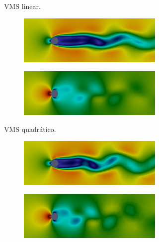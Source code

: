 \begin{figure}[h!]
\begin{subfigure}{\textwidth}
\begin{subfigure}{.42\textwidth}
        \end{subfigure}
        \caption{VMS linear.}
    \end{subfigure}
    \begin{subfigure}{\textwidth}\centering
        \begin{subfigure}{.42\textwidth}
            \includegraphics[width=\linewidth]{Figuras/cylinder/VMS-Qua-vel.png}
        \end{subfigure}
        \begin{subfigure}{.42\textwidth}
            \includegraphics[width=\linewidth]{Figuras/cylinder/VMS-Qua-pre.png}
        \end{subfigure}
        \caption{VMS quadrático.}
    \end{subfigure}
    \begin{subfigure}{\textwidth}\centering
        \begin{subfigure}{.42\textwidth}
            \includegraphics[width=\linewidth]{Figuras/cylinder/LES-vel.png}
        \end{subfigure}
        \begin{subfigure}{.42\textwidth}
            \includegraphics[width=\linewidth]{Figuras/cylinder/LES-pre.png}

\end{subfigure}
\end{subfigure}
\end{figure}
